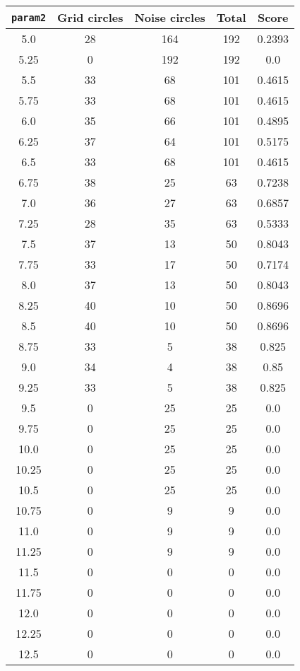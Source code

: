 \documentclass[letterpaper, 12pt]{article}
\begin{document}
\begin{longtable}{|c|c|c|c|c|}
\hline
\textbf{\texttt{param2}} & \textbf{Grid circles} & \textbf{Noise circles} & \textbf{Total} & \textbf{Score} \\
\hline
5.0 & 28 & 164 & 192 & 0.2393 \\
\hline
5.25 & 0 & 192 & 192 & 0.0 \\
\hline
5.5 & 33 & 68 & 101 & 0.4615 \\
\hline
5.75 & 33 & 68 & 101 & 0.4615 \\
\hline
6.0 & 35 & 66 & 101 & 0.4895 \\
\hline
6.25 & 37 & 64 & 101 & 0.5175 \\
\hline
6.5 & 33 & 68 & 101 & 0.4615 \\
\hline
6.75 & 38 & 25 & 63 & 0.7238 \\
\hline
7.0 & 36 & 27 & 63 & 0.6857 \\
\hline
7.25 & 28 & 35 & 63 & 0.5333 \\
\hline
7.5 & 37 & 13 & 50 & 0.8043 \\
\hline
7.75 & 33 & 17 & 50 & 0.7174 \\
\hline
8.0 & 37 & 13 & 50 & 0.8043 \\
\hline
8.25 & 40 & 10 & 50 & 0.8696 \\
\hline
8.5 & 40 & 10 & 50 & 0.8696 \\
\hline
8.75 & 33 & 5 & 38 & 0.825 \\
\hline
9.0 & 34 & 4 & 38 & 0.85 \\
\hline
9.25 & 33 & 5 & 38 & 0.825 \\
\hline
9.5 & 0 & 25 & 25 & 0.0 \\
\hline
9.75 & 0 & 25 & 25 & 0.0 \\
\hline
10.0 & 0 & 25 & 25 & 0.0 \\
\hline
10.25 & 0 & 25 & 25 & 0.0 \\
\hline
10.5 & 0 & 25 & 25 & 0.0 \\
\hline
10.75 & 0 & 9 & 9 & 0.0 \\
\hline
11.0 & 0 & 9 & 9 & 0.0 \\
\hline
11.25 & 0 & 9 & 9 & 0.0 \\
\hline
11.5 & 0 & 0 & 0 & 0.0 \\
\hline
11.75 & 0 & 0 & 0 & 0.0 \\
\hline
12.0 & 0 & 0 & 0 & 0.0 \\
\hline
12.25 & 0 & 0 & 0 & 0.0 \\
\hline
12.5 & 0 & 0 & 0 & 0.0 \\

\end{longtable}
\end{document}
